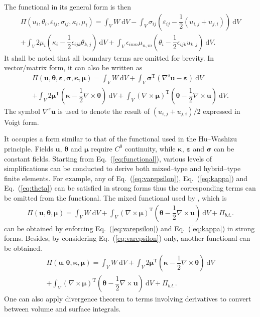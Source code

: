 \documentclass[3p,sort&compress,11pt,fleqn]{elsarticle}
\newcommand*{\eqsref}[1]{Eq.~(\ref{#1})}
\newcommand*{\mT}{\mathrm{T}}
\newcommand*{\md}[1]{\mathrm{d}#1}
\begin{document}
The functional in its general form is then
\begin{multline}
\varPi\left(u_i,\theta_i,\varepsilon_{ij},\sigma_{ij},\kappa_i,\mu_i\right)=\int_VW~\md{V}
-\int_V\sigma_{ij}\left(\varepsilon_{ij}-\dfrac{1}{2}\left(u_{i,j}+u_{j,i}\right)\right)~\md{V}\\
+\int_V2\mu_i\left(\kappa_i-\dfrac{1}{2}\epsilon_{ijk}\theta_{k,j}\right)~\md{V}
+\int_V\epsilon_{imn}\mu_{n,m}\left(\theta_i-\dfrac{1}{2}\epsilon_{ijk}u_{k,j}\right)~\md{V}.
\end{multline}
It shall be noted that all boundary terms are omitted for brevity. In vector/matrix form, it can also be written as
\begin{multline}\label{eq:functional}
\varPi\left(\mathbold{u},\mathbold{\theta},\mathbold{\varepsilon},\mathbold{\sigma},\mathbold{\kappa},\mathbold{\mu}\right)=\int_VW~\md{V}
+\int_V\mathbold{\sigma}^\mT\left(\nabla^s\mathbold{u}-\mathbold{\varepsilon}\right)~\md{V}\\
+\int_V2\mathbold{\mu}^\mT\left(\mathbold{\kappa}-\dfrac{1}{2}\nabla\times\mathbold{\theta}\right)~\md{V}
+\int_V\left(\nabla\times\mathbold{\mu}\right)^\mT\left(\mathbold{\theta}-\dfrac{1}{2}\nabla\times\mathbold{u}\right)~\md{V}.
\end{multline}
The symbol $\nabla^s\mathbold{u}$ is used to denote the result of $\left(u_{i,j}+u_{j,i}\right)/2$ expressed in Voigt form.

It occupies a form similar to that of the functional used in the Hu--Washizu principle. Fields $\mathbold{u}$, $\mathbold{\theta}$ and $\mathbold{\mu}$ require $C^0$ continuity, while $\mathbold{\kappa}$, $\mathbold{\varepsilon}$ and $\mathbold{\sigma}$ can be constant fields. Starting from \eqsref{eq:functional}, various levels of simplifications can be conducted to derive both mixed--type and hybrid--type finite elements. For example, any of \eqsref{eq:varepsilon}, \eqsref{eq:kappa} and \eqsref{eq:theta} can be satisfied in strong forms thus the corresponding terms can be omitted from the functional. The mixed functional used by \citet{Darrall2013}, which is
\begin{gather}
\varPi\left(\mathbold{u},\mathbold{\theta},\mathbold{\mu}\right)=\int_VW~\md{V}
+\int_V\left(\nabla\times\mathbold{\mu}\right)^\mT\left(\mathbold{\theta}-\dfrac{1}{2}\nabla\times\mathbold{u}\right)~\md{V}+\varPi_{b.t.}.
\end{gather}
can be obtained by enforcing \eqsref{eq:varepsilon} and \eqsref{eq:kappa} in strong forms. Besides, by considering \eqsref{eq:varepsilon} only, another functional can be obtained.
\begin{multline}
\varPi\left(\mathbold{u},\mathbold{\theta},\mathbold{\kappa},\mathbold{\mu}\right)=\int_VW~\md{V}
+\int_V2\mathbold{\mu}^\mT\left(\mathbold{\kappa}-\dfrac{1}{2}\nabla\times\mathbold{\theta}\right)~\md{V}\\
+\int_V\left(\nabla\times\mathbold{\mu}\right)^\mT\left(\mathbold{\theta}-\dfrac{1}{2}\nabla\times\mathbold{u}\right)~\md{V}+\varPi_{b.t.}.
\end{multline}
One can also apply divergence theorem to terms involving derivatives to convert between volume and surface integrals.
\end{document}
